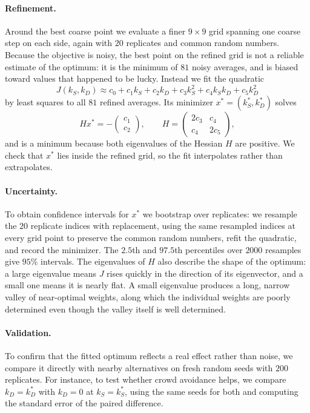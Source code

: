 \documentclass[14pt]{article}
\theoremstyle{definition}
\begin{document}
\paragraph{Refinement.} Around the best coarse point we evaluate a finer $9 \times 9$ grid
spanning one coarse step on each side, again with $20$ replicates and common random
numbers. Because the objective is noisy, the best point on the refined grid is not a
reliable estimate of the optimum: it is the minimum of $81$ noisy averages, and is biased
toward values that happened to be lucky. Instead we fit the quadratic
\begin{equation}\label{eq:quadratic_fit}
  J(k_S, k_D) \approx c_0 + c_1 k_S + c_2 k_D + c_3 k_S^2 + c_4 k_S k_D + c_5 k_D^2
\end{equation}
by least squares to all $81$ refined averages. Its minimizer $x^* = (k_S^*, k_D^*)$
solves
\begin{equation}\label{eq:quadratic_min}
  H x^* = -\begin{pmatrix} c_1 \\ c_2 \end{pmatrix}, \qquad
  H = \begin{pmatrix} 2c_3 & c_4 \\ c_4 & 2c_5 \end{pmatrix},
\end{equation}
and is a minimum because both eigenvalues of the Hessian $H$ are positive. We check
that $x^*$ lies inside the refined grid, so the fit interpolates rather than
extrapolates.

\paragraph{Uncertainty.} To obtain confidence intervals for $x^*$ we bootstrap over
replicates: we resample the $20$ replicate indices with replacement, using the same
resampled indices at every grid point to preserve the common random numbers, refit the
quadratic, and record the minimizer. The $2.5$th and $97.5$th percentiles over $2000$
resamples give $95\%$ intervals. The eigenvalues of $H$ also describe the shape of the
optimum: a large eigenvalue means $J$ rises quickly in the direction of its eigenvector,
and a small one means it is nearly flat. A small eigenvalue produces a long, narrow
valley of near-optimal weights, along which the individual weights are poorly determined
even though the valley itself is well determined.

\paragraph{Validation.} To confirm that the fitted optimum reflects a real effect rather
than noise, we compare it directly with nearby alternatives on fresh random seeds with
$200$ replicates. For instance, to test whether crowd avoidance helps, we compare
$k_D = k_D^*$ with $k_D = 0$ at $k_S = k_S^*$, using the same seeds for both and
computing the standard error of the paired difference.
\end{document}
